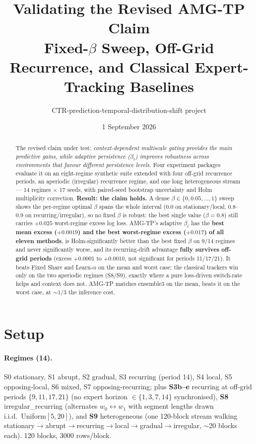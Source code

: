 \documentclass[11pt]{article}
\title{\textbf{Validating the Revised AMG-TP Claim}\\[4pt]
\large Fixed-$\beta$ Sweep, Off-Grid Recurrence, and Classical Expert-Tracking Baselines}
\author{CTR-prediction-temporal-distribution-shift project}
\date{1 September 2026}
\begin{document}
\maketitle

\begin{abstract}
\noindent
The revised claim under test: \emph{context-dependent multiscale gating provides
the main predictive gains, while adaptive persistence ($\beta_t$) improves
robustness across environments that favour different persistence levels.} Four
experiment packages evaluate it on an eight-regime synthetic suite extended with
four off-grid recurrence periods, an aperiodic (irregular) recurrence regime, and
one long heterogeneous stream --- 14 regimes $\times$ 17 seeds, with paired-seed
bootstrap uncertainty and Holm multiplicity correction. \textbf{Result: the claim
holds.} A dense $\beta \in \{0,0.05,\dots,1\}$ sweep shows the per-regime optimal
$\beta$ spans the whole interval (0.0 on stationary/local, 0.8--0.9 on
recurring/irregular), so no fixed $\beta$ is robust: the best single value
($\beta{=}0.8$) still carries $+0.025$ worst-regime excess log loss. AMG-TP's
adaptive $\beta_t$ has the \textbf{best mean excess ($+0.0019$) and the best
worst-regime excess ($+0.017$) of all eleven methods}, is Holm-significantly
better than the best fixed $\beta$ on 9/14 regimes and never significantly worse,
and its recurring-drift advantage \textbf{fully survives off-grid periods}
(excess $+0.0001$ to $+0.0010$, not significant for periods 11/17/21). It beats
Fixed Share and Learn-$\alpha$ on the mean and worst case; the classical trackers
win only on the two aperiodic regimes (S8/S9), exactly where a pure loss-driven
switch-rate helps and context does not. AMG-TP matches ensemble3 on the mean,
beats it on the worst case, at $\sim$1/3 the inference cost.
\end{abstract}

\section{Setup}

\paragraph{Regimes (14).} S0 stationary, S1 abrupt, S2 gradual, S3 recurring
(period 14), S4 local, S5 opposing-local, S6 mixed, S7 opposing-recurring; plus
\textbf{S3b--e} recurring at off-grid periods $\{9,11,17,21\}$ (no expert horizon
$\in\{1,3,7,14\}$ synchronised), \textbf{S8} irregular\_recurring (alternates
$w_0\!\leftrightarrow\!w_1$ with segment lengths drawn i.i.d.\ Uniform$[5,20]$),
and \textbf{S9} heterogeneous (one 120-block stream walking
stationary$\to$abrupt$\to$recurring$\to$local$\to$gradual$\to$irregular, $\sim$20
blocks each). 120 blocks, 3000 rows/block.
\end{document}
